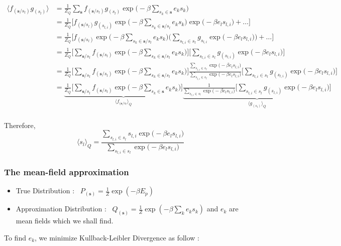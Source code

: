 \begin{align*}
	\langle  f_{(\boldsymbol{s} / s_l) } g_{(s_l)}  \rangle &= \frac{1}{Z_Q} \sum_{\boldsymbol{s}} f_{(\boldsymbol{s} / s_l) } g_{(s_l)} \exp{ \Bigg (  -\beta \sum_{ s_k \in \boldsymbol{s}}  e_k s_k \Bigg ) }  \\
	&= \frac{1}{Z_Q} \Bigg [  f_{(\boldsymbol{s} / s_l)} g_{(s_{l,i})}  \exp{ \bigg ( -\beta \sum_{ s_k \in \boldsymbol{s} / s_l}  e_k s_k \bigg ) \exp{ \bigg (  -\beta e_l s_{l,i} \bigg ) }+  \dots  }                            \Bigg ] \\
	&= \frac{1}{Z_Q} \Bigg [  f_{(\boldsymbol{s} / s_l)}  \exp{ \bigg ( -\beta \sum_{ s_k \in \boldsymbol{s} / s_l}  e_k s_k \bigg ) \bigg( \sum_{s_{l,i} \in s_l} g_{s_{l,i}}  \exp{ \bigg (  -\beta e_l s_{l,i} \bigg ) } \bigg) +  \dots  }                            \Bigg ] \\
	&= \frac{1}{Z_Q} \Bigg [ \sum_{\boldsymbol{s} / s_l}  f_{(\boldsymbol{s} / s_l) }  \exp{ \bigg (  -\beta \sum_{ s_k \in \boldsymbol{s} / s_l}  e_k s_k \bigg ) }  \Bigg ] \Bigg[  \sum_{s_{l,i} \in s_l} g_{(s_{l,i})} \exp{ \bigg ( -\beta e_l s_{l,i} \bigg)}\Bigg] \\
	&= \frac{1}{Z_Q} \Bigg [ \sum_{\boldsymbol{s} / s_l}  f_{(\boldsymbol{s} / s_l) }  \exp{ \bigg (  -\beta \sum_{ s_k \in \boldsymbol{s} / s_l}  e_k s_k \bigg ) }  \Bigg ] \frac{ \sum_{s_{l,i} \in s_l} \exp{ \bigg ( -\beta e_l s_{l,i} \bigg)}}{ \sum_{s_{l,i} \in s_l} \exp{ \bigg ( -\beta e_l s_{l,i} \bigg)} }      \Bigg[  \sum_{s_{l,i} \in s_l} g_{(s_{l,i})} \exp{ \bigg ( -\beta e_l s_{l,i} \bigg)}\Bigg] \\
	&= \underbrace{ \frac{1}{Z_Q} \Bigg [ \sum_{\boldsymbol{s} / s_l}  f_{(\boldsymbol{s} / s_l) }  \exp{ \bigg (  -\beta \sum_{ s_k \in \boldsymbol{s} }  e_k s_k \bigg ) }  \Bigg ] }_{ \langle f_{(\boldsymbol{s} / s_l} \rangle_{Q} } \underbrace{\frac{1}{ \sum_{s_{l,i} \in s_l} \exp{ \bigg ( -\beta e_l s_{l,i} \bigg)} }      \Bigg[  \sum_{s_{l,i} \in s_l} g_{(s_{l,i})} \exp{ \bigg ( -\beta e_l s_{l,i} \bigg)}\Bigg]}_{\langle g_{(s_l)} \rangle_{Q} } \\
\end{align*}

Therefore,  
$$
\langle s_l \rangle_Q = \frac{ \sum_{s_{l,i} \in s_l} s_{l,i} \exp{ \bigg ( -\beta e_l s_{l,i} \bigg)} }{ \sum_{s_{l,i} \in s_l} \exp{ \bigg ( -\beta e_l s_{l,i} \bigg)} } 
$$


\subsubsection{The mean-field approximation}
\begin{itemize}
	\item True Distribution : \ $P_{(\boldsymbol{s})} = \frac{1}{Z}\exp{(-\beta E_p)}$
	\item Approximation Distribution : \ $Q_{(\boldsymbol{s})} = \frac{1}{Z}\exp{(-\beta \sum_{k} e_k s_k )}$ and $e_k$ are mean fields which we shall find.
\end{itemize}
To find $e_k$, we minimize Kullback-Leibler Divergence as follow : 

